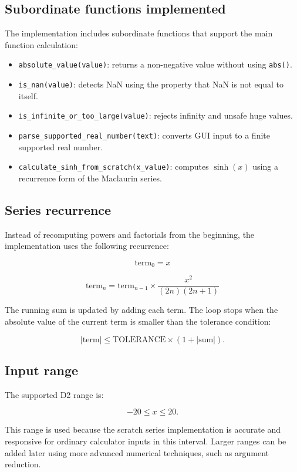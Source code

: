 \documentclass[11pt]{article}
\begin{document}
\subsection{Subordinate functions implemented}

The implementation includes subordinate functions that support the main function calculation:

\begin{itemize}
    \item \texttt{absolute\_value(value)}: returns a non-negative value without using \texttt{abs()}.
    \item \texttt{is\_nan(value)}: detects NaN using the property that NaN is not equal to itself.
    \item \texttt{is\_infinite\_or\_too\_large(value)}: rejects infinity and unsafe huge values.
    \item \texttt{parse\_supported\_real\_number(text)}: converts GUI input to a finite supported real number.
    \item \texttt{calculate\_sinh\_from\_scratch(x\_value)}: computes $\sinh(x)$ using a recurrence form of the Maclaurin series.
\end{itemize}

\subsection{Series recurrence}

Instead of recomputing powers and factorials from the beginning, the implementation uses the following recurrence:

\[
\text{term}_0=x
\]

\[
\text{term}_n=\text{term}_{n-1}\times \frac{x^2}{(2n)(2n+1)}
\]

The running sum is updated by adding each term. The loop stops when the absolute value of the current term is smaller than the tolerance condition:

\[
|\text{term}| \leq \text{TOLERANCE}\times(1+|\text{sum}|).
\]

\subsection{Input range}

The supported D2 range is:

\[
-20 \leq x \leq 20.
\]

This range is used because the scratch series implementation is accurate and responsive for ordinary calculator inputs in this interval. Larger ranges can be added later using more advanced numerical techniques, such as argument reduction.
\end{document}
